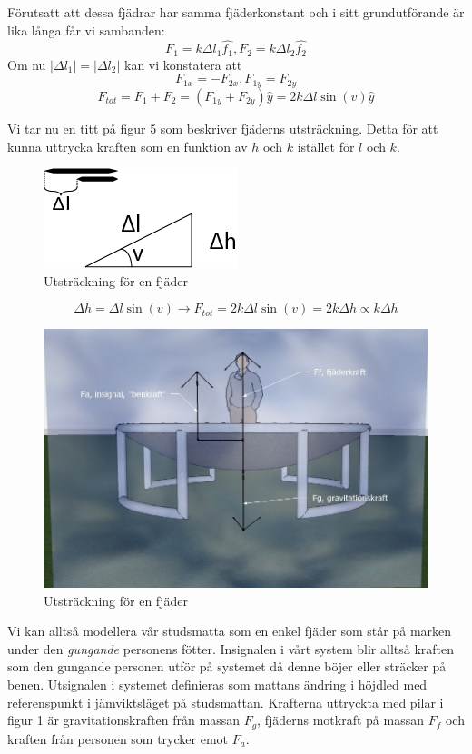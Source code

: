 \documentclass[10pt,a4paper]{article}
\begin{document}
Förutsatt att dessa fjädrar har samma fjäderkonstant och i sitt grundutförande är lika långa får vi sambanden:
$$F_1=k\Delta l_1\hat{f_1}, F_2=k\Delta l_2\hat{f_2}$$
Om nu $|\Delta l_1|=|\Delta l_2|$ kan vi konstatera att
$$F_{1x}=-F_{2x}, F_{1y}=F_{2y}$$
$$F_{tot}=F_1+F_2=(F_{1y}+F_{2y})\hat{y}=2k\Delta l\sin(v)\hat{y}$$

\pagebreak
Vi tar nu en titt på figur 5 som beskriver fjäderns utsträckning. Detta för att kunna uttrycka kraften som en funktion av $h$ och $k$ istället för $l$ och $k$.

\begin{figure}[ht]
\begin{center}
\includegraphics[scale=0.5]{utstrackning}
\caption{Utsträckning för en fjäder}
\end{center}
\end{figure}

$$\Delta h = \Delta l \sin(v) \rightarrow F_{tot}=2k\Delta l \sin(v)=2k\Delta h\propto k\Delta h $$

\begin{figure}[ht]
\begin{center}
\includegraphics[scale=0.5]{BildKrafter}
\caption{Utsträckning för en fjäder}
\end{center}
\end{figure}

Vi kan alltså modellera vår studsmatta som en enkel fjäder som står på marken under den \emph{gungande} personens fötter.
Insignalen i vårt system blir alltså kraften som den gungande personen utför på systemet då denne böjer eller sträcker på benen. Utsignalen i systemet definieras som mattans ändring i höjdled med referenspunkt i jämviktsläget på studsmattan. 
Krafterna uttryckta med pilar i figur 1 är gravitationskraften från massan $F_g$, fjäderns motkraft på massan $F_f$ och kraften från personen som trycker emot $F_a$.
\end{document}
